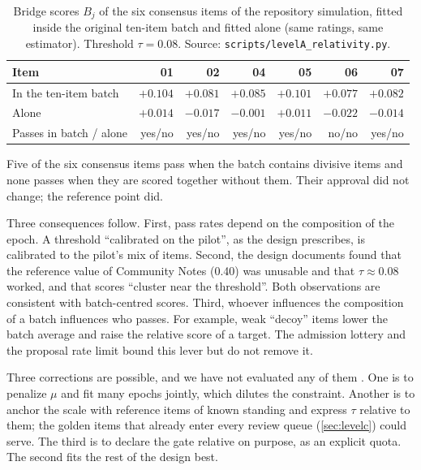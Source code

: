 \begin{table}[t]
\centering\small
\caption{Bridge scores $B_j$ of the six consensus items of the repository simulation, fitted
inside the original ten-item batch and fitted alone (same ratings, same estimator). Threshold
$\tau=0.08$. Source: \texttt{scripts/levelA\_relativity.py}.}
\label{tab:relativity}
\begin{tabular}{@{}lrrrrrr@{}}
\toprule
Item & 01 & 02 & 04 & 05 & 06 & 07\\
\midrule
In the ten-item batch & $+0.104$ & $+0.081$ & $+0.085$ & $+0.101$ & $+0.077$ & $+0.082$\\
Alone                 & $+0.014$ & $-0.017$ & $-0.001$ & $+0.011$ & $-0.022$ & $-0.014$\\
\midrule
Passes in batch / alone & yes/no & yes/no & yes/no & yes/no & no/no & yes/no\\
\bottomrule
\end{tabular}
\end{table}

\begin{finding}\label{find:relativity}\empirical{}
Five of the six consensus items pass when the batch contains divisive items and none passes
when they are scored together without them. Their approval did not change; the reference
point did.
\end{finding}

Three consequences follow. First, pass rates depend on the composition of the epoch. A
threshold ``calibrated on the pilot'', as the design prescribes, is calibrated to the pilot's
mix of items. Second, the design documents found that the reference value of Community Notes
(0.40) was unusable and that $\tau\approx0.08$ worked, and that scores ``cluster near the
threshold''. Both observations are consistent with batch-centred scores. Third, whoever
influences the composition of a batch influences who passes. For example, weak ``decoy''
items lower the batch average and raise the relative score of a target. The admission lottery
and the proposal rate limit bound this lever but do not remove it.

Three corrections are possible, and we have not evaluated any of them \openq. One is to penalize $\mu$
and fit many epochs jointly, which dilutes the constraint. Another is to anchor the scale with reference items of known standing and
express $\tau$ relative to them; the golden items that already enter every review queue
(\cref{sec:levelc}) could serve. The third is to declare the gate relative on purpose, as an
explicit quota. The second fits the rest of the design best.

